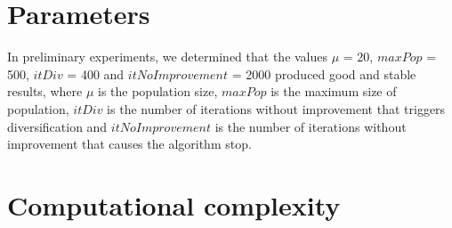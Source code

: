 \section{Parameters}
In preliminary experiments, we determined that the values $\mu$ = 20, $maxPop$ = 500, $itDiv$ = 400 and $itNoImprovement$ = 2000 produced good and stable results, where $\mu$ is the population size, $maxPop$ is the maximum size of population, $itDiv$ is the number of iterations without improvement that triggers diversification and $itNoImprovement$ is the number of iterations without improvement that causes the algorithm stop.

\section{Computational complexity}